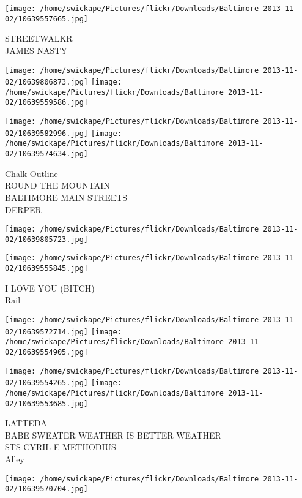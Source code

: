 \documentclass[10pt,letterpaper]{article}
\begin{document}
\vspace{0.25in}
\texttt{[image: /home/swickape/Pictures/flickr/Downloads/Baltimore 2013-11-02/10639557665.jpg]}

STREETWALKR\\
JAMES NASTY\\
\pagebreak

\texttt{[image: /home/swickape/Pictures/flickr/Downloads/Baltimore 2013-11-02/10639806873.jpg]}
\texttt{[image: /home/swickape/Pictures/flickr/Downloads/Baltimore 2013-11-02/10639559586.jpg]}

\texttt{[image: /home/swickape/Pictures/flickr/Downloads/Baltimore 2013-11-02/10639582996.jpg]}
\texttt{[image: /home/swickape/Pictures/flickr/Downloads/Baltimore 2013-11-02/10639574634.jpg]}

Chalk Outline\\
ROUND THE MOUNTAIN\\
BALTIMORE MAIN STREETS\\
DERPER\\
\pagebreak

\texttt{[image: /home/swickape/Pictures/flickr/Downloads/Baltimore 2013-11-02/10639805723.jpg]}

\vspace{0.25in}
\texttt{[image: /home/swickape/Pictures/flickr/Downloads/Baltimore 2013-11-02/10639555845.jpg]}

I LOVE YOU (BITCH)\\
Rail\\
\pagebreak

\texttt{[image: /home/swickape/Pictures/flickr/Downloads/Baltimore 2013-11-02/10639572714.jpg]}
\texttt{[image: /home/swickape/Pictures/flickr/Downloads/Baltimore 2013-11-02/10639554905.jpg]}

\texttt{[image: /home/swickape/Pictures/flickr/Downloads/Baltimore 2013-11-02/10639554265.jpg]}
\texttt{[image: /home/swickape/Pictures/flickr/Downloads/Baltimore 2013-11-02/10639553685.jpg]}

LATTEDA\\
BABE SWEATER WEATHER IS BETTER WEATHER\\
STS CYRIL E METHODIUS\\
Alley\\
\pagebreak

\texttt{[image: /home/swickape/Pictures/flickr/Downloads/Baltimore 2013-11-02/10639570704.jpg]}
\end{document}
